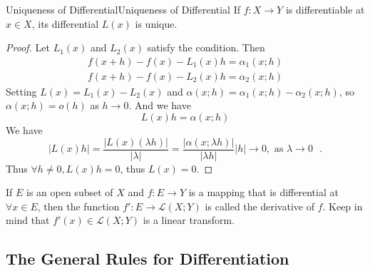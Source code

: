 \documentclass[../main.tex]{subfiles}
\begin{document}
\begin{theorem}{Uniqueness of Differential}{Uniqueness of Differential}
If $f:X \rightarrow Y$ is differentiable at $x\in X$, its differential $L(x)$ is unique.
\end{theorem}
\begin{proof}
Let $L_1(x)$ and $L_2(x)$ satisfy the condition. Then
\begin{equation*}
\begin{aligned}
f(x+h)-f(x)-L_1(x)h = \alpha_1(x;h)\\
f(x+h)-f(x)-L_2(x)h = \alpha_2(x;h)
\end{aligned}
\end{equation*}
Setting $L(x)=L_1(x)-L_2(x)$ and $\alpha(x;h) = \alpha_1(x;h)-\alpha_2(x;h)$, so $\alpha(x;h) = o(h)$ as $h \rightarrow 0$. And we have
\begin{equation*}
L(x)h = \alpha(x;h)
\end{equation*}
We have
\begin{equation*}
\left|L(x)h\right| = \frac{\left|L(x)(\lambda h)\right|}{\left|\lambda\right|} = \frac{\left|\alpha(x;\lambda h)\right|}{\left|\lambda h\right|}\left|h\right| \rightarrow 0, \text{ as $\lambda \rightarrow 0$ }.
\end{equation*}
Thus $\forall h\neq 0,L(x)h=0$, thus $L(x)=0$.
\end{proof}

If $E$ is an open subset of $X$ and $f:E \rightarrow Y$ is a mapping that is differential at $\forall x\in E$, then the function $f':E \rightarrow \mathscr{L}(X;Y)$ is called the derivative of $f$. Keep in mind that $f'(x)\in \mathscr{L}(X;Y)$ is a linear transform.

\subsection{The General Rules for Differentiation}
\end{document}
